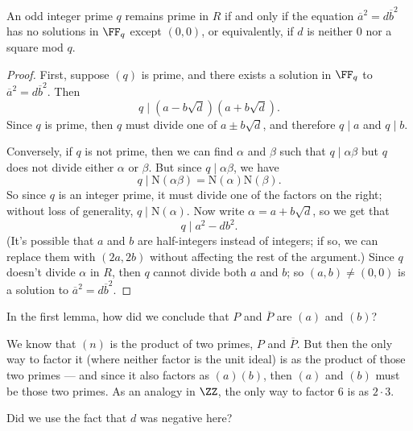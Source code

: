 \begin{lemma}
An odd integer prime $q$ remains prime in $R$ if and only if the equation $\overline{a}^2 = d\overline{b}^2$ has no solutions in $\FF_q$ except $(0, 0)$, or equivalently, if $d$ is neither $0$ nor a square mod $q$. 
\end{lemma}

\begin{proof}
First, suppose $(q)$ is prime, and there exists a solution in $\FF_q$ to $\overline{a}^2 = d\overline{b}^2$. Then \[q \mid (a - b\sqrt{d})(a + b\sqrt{d}).\] Since $q$ is prime, then $q$ must divide one of $a \pm b\sqrt{d}$, and therefore $q \mid a$ and $q \mid b$. 

Conversely, if $q$ is not prime, then we can find $\alpha$ and $\beta$ such that $q \mid \alpha\beta$ but $q$ does not divide either $\alpha$ or $\beta$. But since $q \mid \alpha\beta$, we have \[q \mid \mathrm{N}(\alpha\beta) = \mathrm{N}(\alpha)\mathrm{N}(\beta).\] So since $q$ is an integer prime, it must divide one of the factors on the right; without loss of generality, $q \mid \mathrm{N}(\alpha)$. Now write $\alpha = a + b\sqrt{d}$, so we get that \[q \mid a^2 - db^2.\] (It's possible that $a$ and $b$ are half-integers instead of integers; if so, we can replace them with $(2a, 2b)$ without affecting the rest of the argument.) Since $q$ doesn't divide $\alpha$ in $R$, then $q$ cannot divide both $a$ and $b$; so $(a, b) \neq (0, 0)$ is a solution to $\overline{a}^2 = d\overline{b}^2$. %
\end{proof}

\begin{question}
In the first lemma, how did we conclude that $P$ and $\overline{P}$ are $(a)$ and $(b)$?
\end{question}

\begin{ans}
We know that $(n)$ is the product of two primes, $P$ and $\overline{P}$. But then the only way to factor it (where neither factor is the unit ideal) is as the product of those two primes --- and since it also factors as $(a)(b)$, then $(a)$ and $(b)$ must be those two primes. As an analogy in $\ZZ$, the only way to factor $6$ is as $2\cdot 3$.
\end{ans}

\begin{question}
Did we use the fact that $d$ was negative here?
\end{question}

